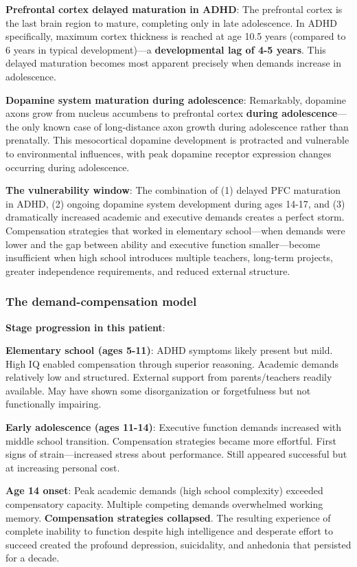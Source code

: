 \textbf{Prefrontal cortex delayed maturation in ADHD}: The prefrontal cortex is the last brain region to mature, completing only in late adolescence. In ADHD specifically, maximum cortex thickness is reached at age 10.5 years (compared to 6 years in typical development)---a \textbf{developmental lag of 4-5 years}. This delayed maturation becomes most apparent precisely when demands increase in adolescence.

\textbf{Dopamine system maturation during adolescence}: Remarkably, dopamine axons grow from nucleus accumbens to prefrontal cortex \textbf{during adolescence}---the only known case of long-distance axon growth during adolescence rather than prenatally. This mesocortical dopamine development is protracted and vulnerable to environmental influences, with peak dopamine receptor expression changes occurring during adolescence.

\textbf{The vulnerability window}: The combination of (1) delayed PFC maturation in ADHD, (2) ongoing dopamine system development during ages 14-17, and (3) dramatically increased academic and executive demands creates a perfect storm. Compensation strategies that worked in elementary school---when demands were lower and the gap between ability and executive function smaller---become insufficient when high school introduces multiple teachers, long-term projects, greater independence requirements, and reduced external structure.

\subsubsection{The demand-compensation model}\label{10a_trd_basis-the-demand-compensation-model}

\textbf{Stage progression in this patient}:

\textbf{Elementary school (ages 5-11)}: ADHD symptoms likely present but mild. High IQ enabled compensation through superior reasoning. Academic demands relatively low and structured. External support from parents/teachers readily available. May have shown some disorganization or forgetfulness but not functionally impairing.

\textbf{Early adolescence (ages 11-14)}: Executive function demands increased with middle school transition. Compensation strategies became more effortful. First signs of strain---increased stress about performance. Still appeared successful but at increasing personal cost.

\textbf{Age 14 onset}: Peak academic demands (high school complexity) exceeded compensatory capacity. Multiple competing demands overwhelmed working memory. \textbf{Compensation strategies collapsed}. The resulting experience of complete inability to function despite high intelligence and desperate effort to succeed created the profound depression, suicidality, and anhedonia that persisted for a decade.

